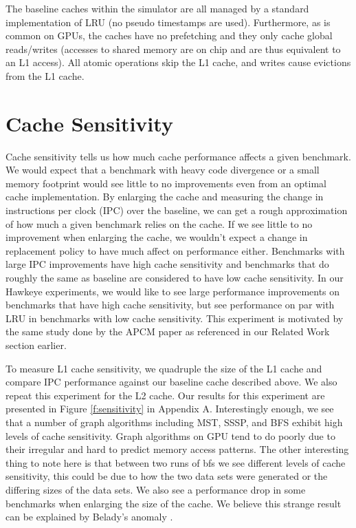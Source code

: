 The baseline caches within the simulator are all managed by a standard implementation of LRU (no pseudo timestamps are used). Furthermore, as is common on GPUs, the caches have no prefetching and they only cache global reads/writes (accesses to shared memory are on chip and are thus equivalent to an L1 access). All atomic operations skip the L1 cache, and writes cause evictions from the L1 cache.

\section{Cache Sensitivity}
Cache sensitivity tells us how much cache performance affects a given benchmark. We would expect that a benchmark with heavy code divergence or a small memory footprint would see little to no improvements even from an optimal cache implementation. By enlarging the cache and measuring the change in instructions per clock (IPC) over the baseline, we can get a rough approximation of how much a given benchmark relies on the cache. If we see little to no improvement when enlarging the cache, we wouldn't expect a change in replacement policy to have much affect on performance either. Benchmarks with large IPC improvements have high cache sensitivity and benchmarks that do roughly the same as baseline are considered to have low cache sensitivity. In our Hawkeye experiments, we would like to see large performance improvements on benchmarks that have high cache sensitivity, but see performance on par with LRU in benchmarks with low cache sensitivity. This experiment is motivated by the same study done by the APCM paper as referenced in our Related Work section earlier.

To measure L1 cache sensitivity, we quadruple the size of the L1 cache and compare IPC performance against our baseline cache described above. We also repeat this experiment for the L2 cache. Our results for this experiment are presented in Figure \ref{f:sensitivity} in Appendix A. Interestingly enough, we see that a number of graph algorithms including MST, SSSP, and BFS exhibit high levels of cache sensitivity. Graph algorithms on GPU tend to do poorly due to their irregular and hard to predict memory access patterns. The other interesting thing to note here is that between two runs of bfs we see different levels of cache sensitivity, this could be due to how the two data sets were generated or the differing sizes of the data sets. We also see a performance drop in some benchmarks when enlarging the size of the cache. We believe this strange result can be explained by Belady’s anomaly \cite{belady_anomaly}.

